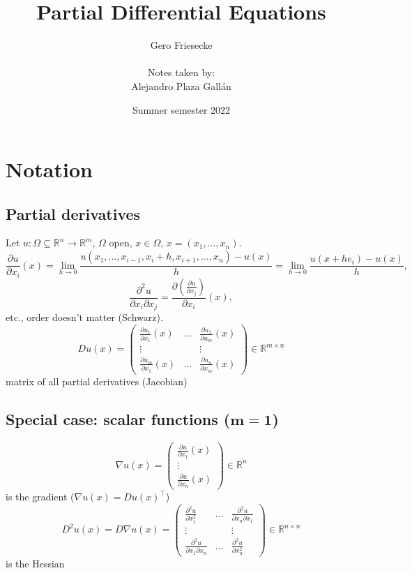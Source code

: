 \documentclass[12pt]{article}
\title{Partial Differential Equations}
\author{Gero Friesecke\\\\Notes taken by:\\Alejandro Plaza Gall\'an}
\date{Summer semester 2022}
\theoremstyle{definition}
\begin{document}
\maketitle
\tableofcontents
\newpage
\setcounter{section}{-1}
\section{Notation}
\subsection*{Partial derivatives}
Let $u:\Omega\subseteq\mathbb R^n\rightarrow\mathbb R^m$, $\Omega$ open, $x\in\Omega$, $x=(x_1,\ldots,x_n)$.
\[\frac{\partial u}{\partial x_i}(x)=\lim_{h\to0}\frac{u(x_1,\ldots,x_{i-1},x_i+h,x_{i+1},\ldots,x_n)-u(x)}h=\lim_{h\to0}\frac{u(x+he_i)-u(x)}h,\]
\[\frac{\partial^2u}{\partial x_i\partial x_j}=\frac{\partial(\frac{\partial u}{\partial x_j})}{\partial x_i}(x),\]
etc., order doesn't matter (Schwarz).
\[Du(x)=\left(\begin{matrix}\frac{\partial u_1}{\partial x_1}(x)&\ldots&\frac{\partial u_1}{\partial u_m}(x)\\\vdots&&\vdots\\\frac{\partial u_m}{\partial x_1}(x)&\ldots&\frac{\partial u_n}{\partial x_m}(x)\end{matrix}\right)\in\mathbb R^{m\times n}\]
matrix of all partial derivatives (Jacobian)

\subsection*{Special case: scalar functions ($\boldsymbol{m=1}$)}
\[\nabla u(x)=\left(\begin{matrix}\frac{\partial u}{\partial x_1}(x)\\\vdots\\\frac{\partial u}{\partial x_n}(x)\end{matrix}\right)\in\mathbb R^n\]
is the gradient ($\nabla u(x)=Du(x)^\intercal$)
\[D^2u(x)=D\nabla u(x)=\left(\begin{matrix}\frac{\partial^2u}{\partial x_1^2}&\ldots&\frac{\partial^2u}{\partial x_n\partial x_1}\\\vdots&&\vdots\\\frac{\partial^2u}{\partial x_1\partial x_n}&\ldots&\frac{\partial^2u}{\partial x_n^2}\end{matrix}\right)\in\mathbb R^{n\times n}\]
is the Hessian
\end{document}
